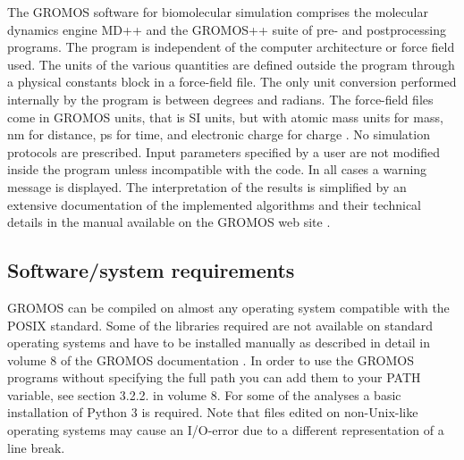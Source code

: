 The GROMOS software for biomolecular simulation comprises the molecular dynamics engine MD++ and the \linebreak GROMOS++ suite of pre- and postprocessing programs. The program is independent of the computer architecture or force field used. 
The units of the various quantities are defined outside the program through a physical constants block in a force-field file. The only unit conversion performed internally by the program is between degrees and radians. The force-field files come 
in GROMOS units, that is SI units, but with atomic mass units for mass, nm for distance, ps for time, and electronic charge for charge \cite{volume_6}. No simulation protocols are prescribed. 
Input parameters specified by a user are not modified inside 
the program unless incompatible with the code. In all cases a warning message is displayed. The interpretation of the results is simplified by an extensive 
documentation of the implemented algorithms and their technical details 
in the manual available on the GROMOS web site \cite{volume_6,volume_2}.

\subsection{Software/system requirements}
%
GROMOS can be compiled on almost any operating system compatible with the POSIX standard.
 Some of the libraries required are not available on standard operating systems and have to be installed 
manually as described in detail in volume 8 of the GROMOS documentation \cite{volume_8}. 
In order to use the GROMOS programs without specifying the full path you can add them to your PATH variable, see section 3.2.2. in volume 8.
For some of the analyses a basic installation of Python 3 is required. 
Note that files edited on non-Unix-like operating systems may cause an I/O-error due to a different representation of a line break.

